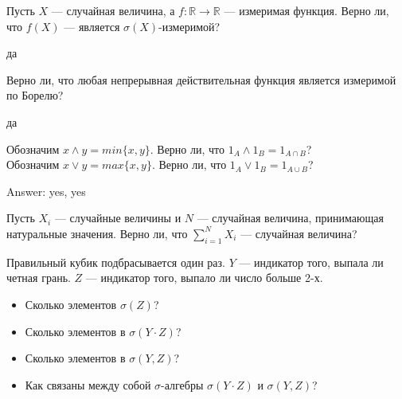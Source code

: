 \begin{problem}
Пусть $X$ — случайная величина, а $f:\mathbb{R}\rightarrow
\mathbb{R}$ — измеримая функция.
Верно ли, что $f(X)$ — является $\sigma(X)$-измеримой?

\begin{sol}
да
\end{sol}
\end{problem}

\begin{problem}
Верно ли, что любая непрерывная действительная функция является
измеримой по Борелю?

\begin{sol}
да
\end{sol}
\end{problem}

\begin{problem}
Обозначим $x \wedge y = min\{x,y\}$. Верно ли, что $1_{A} \wedge
1_{B}=1_{A\cap B}$? \\
Обозначим $x \vee y = max\{x,y\}$. Верно ли, что $1_{A} \vee
1_{B}=1_{A\cup B}$?

\begin{sol}

Answer: yes, yes
\end{sol}
\end{problem}

\begin{problem}
Пусть $X_{i}$ — случайные величины и $N$ — случайная величина,
принимающая натуральные значения. Верно ли, что
$\sum_{i=1}^{N}X_{i}$ — случайная величина?

\begin{sol}

\end{sol}
\end{problem}

\begin{problem}
 Правильный кубик подбрасывается один раз. $Y$ — индикатор того, выпала ли четная грань. $Z$ — индикатор того, выпало ли число больше 2-х. \\
\begin{itemize}
\item Сколько элементов $\sigma(Z)$?
\item Сколько элементов в $\sigma(Y\cdot Z)$?
\item Сколько элементов в $\sigma(Y,Z)$?
\item Как связаны между собой $ \sigma $-алгебры $\sigma(Y\cdot Z)$ и $\sigma(Y,Z)$?
\end{itemize}


\begin{sol}

\end{sol}
\end{problem}

